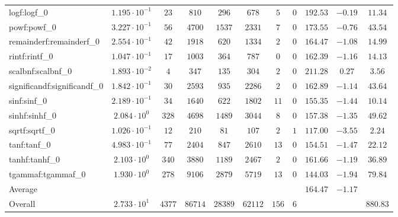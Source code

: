 \begin{tabular}{|l|c|c|c|c|c|c|c|c|c|c|}
logf:logf\_0                 & $ 1.195 \cdot 10^{-1} $ & $ 23     $ & $ 810   $ & $ 296   $ & $ 678   $ & $ 5   $ & $ 0 $ & $ 192.53      $ & $ -0.19   $ & $ 11.34   $ \\
powf:powf\_0                 & $ 3.227 \cdot 10^{-1} $ & $ 56     $ & $ 4700  $ & $ 1537  $ & $ 2331  $ & $ 7   $ & $ 0 $ & $ 173.55      $ & $ -0.76   $ & $ 43.54   $ \\
remainderf:remainderf\_0     & $ 2.554 \cdot 10^{-1} $ & $ 42     $ & $ 1918  $ & $ 620   $ & $ 1334  $ & $ 2   $ & $ 0 $ & $ 164.47      $ & $ -1.08   $ & $ 14.99   $ \\
rintf:rintf\_0               & $ 1.047 \cdot 10^{-1} $ & $ 17     $ & $ 1003  $ & $ 364   $ & $ 787   $ & $ 0   $ & $ 0 $ & $ 162.39      $ & $ -1.16   $ & $ 14.13   $ \\
scalbnf:scalbnf\_0           & $ 1.893 \cdot 10^{-2} $ & $ 4      $ & $ 347   $ & $ 135   $ & $ 304   $ & $ 2   $ & $ 0 $ & $ 211.28      $ & $ 0.27    $ & $ 3.56    $ \\
significandf:significandf\_0 & $ 1.842 \cdot 10^{-1} $ & $ 30     $ & $ 2593  $ & $ 935   $ & $ 2286  $ & $ 2   $ & $ 0 $ & $ 162.89      $ & $ -1.14   $ & $ 43.64   $ \\
sinf:sinf\_0                 & $ 2.189 \cdot 10^{-1} $ & $ 34     $ & $ 1640  $ & $ 622   $ & $ 1802  $ & $ 11  $ & $ 0 $ & $ 155.35      $ & $ -1.44   $ & $ 10.14   $ \\
sinhf:sinhf\_0               & $ 2.084 \cdot 10^{0}  $ & $ 328    $ & $ 4698  $ & $ 1489  $ & $ 3044  $ & $ 8   $ & $ 0 $ & $ 157.38      $ & $ -1.35   $ & $ 49.62   $ \\
sqrtf:sqrtf\_0               & $ 1.026 \cdot 10^{-1} $ & $ 12     $ & $ 210   $ & $ 81    $ & $ 107   $ & $ 2   $ & $ 1 $ & $ 117.00      $ & $ -3.55   $ & $ 2.24    $ \\
tanf:tanf\_0                 & $ 4.983 \cdot 10^{-1} $ & $ 77     $ & $ 2404  $ & $ 847   $ & $ 2610  $ & $ 13  $ & $ 0 $ & $ 154.51      $ & $ -1.47   $ & $ 22.12   $ \\
tanhf:tanhf\_0               & $ 2.103 \cdot 10^{0}  $ & $ 340    $ & $ 3880  $ & $ 1189  $ & $ 2467  $ & $ 2   $ & $ 0 $ & $ 161.66      $ & $ -1.19   $ & $ 36.89   $ \\
tgammaf:tgammaf\_0           & $ 1.930 \cdot 10^{0}  $ & $ 278    $ & $ 9106  $ & $ 2879  $ & $ 5719  $ & $ 13  $ & $ 0 $ & $ 144.03      $ & $ -1.94   $ & $ 79.84   $ \\
\hline
Average                      & $                     $ & $        $ & $       $ & $       $ & $       $ & $     $ & $   $ & $ 164.47      $ & $ -1.17   $ & $         $ \\
\hline
Overall                      & $ 2.733 \cdot 10^{1}  $ & $ 4377   $ & $ 86714 $ & $ 28389 $ & $ 62112 $ & $ 156 $ & $ 6 $ & $             $ & $         $ & $ 880.83  $ \\
\hline
\end{tabular}

